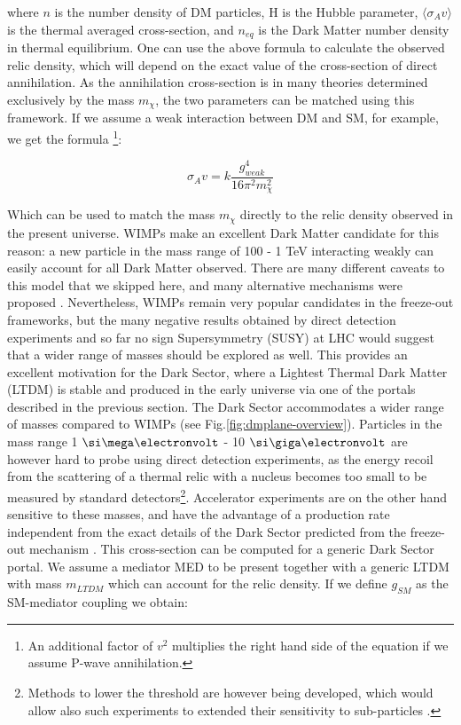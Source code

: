   where $n$ is the number density of DM particles, H is the Hubble parameter,  $\langle \sigma_A v \rangle$ is the thermal averaged cross-section, and $n_{eq}$ is the Dark Matter number density in thermal equilibrium. One can use the above formula to calculate the observed relic density, which will depend on the exact value of the cross-section of direct annihilation. As the annihilation cross-section is in many theories determined exclusively by the mass $m_{\chi}$, the two parameters can be matched using this framework. If we assume a weak interaction between DM and SM, for example, we get the formula \cite{Feng:2010gw}\footnote{An additional factor of $v^2$ multiplies the right hand side of the equation if we assume P-wave annihilation.}:

  \begin{equation}
    \label{eq:dm-fo-sigma}
    \sigma_A v = k \frac{g^4_{weak}}{16 \pi^2 m^2_{\chi}}
  \end{equation}

  Which can be used to match the mass $m_{\chi}$ directly to the relic density observed in the present universe. WIMPs make an excellent Dark Matter candidate for this reason: a new particle in the mass range of 100 \gev - 1 \si{\tera\electronvolt} interacting weakly can easily account for all Dark Matter observed. There are many different caveats to this model that we skipped here, and many alternative mechanisms were proposed \cite{Hall:2009bx,Feng:2010gw,Marsh:2015xka,Griest:1990kh,Arcadi:2017kky}. Nevertheless, WIMPs remain very popular candidates in the freeze-out frameworks, but the many negative results obtained by direct detection experiments and so far no sign Supersymmetry (SUSY) at LHC would suggest that a wider range of masses should be explored as well. This provides an excellent motivation for the Dark Sector, where a Lightest Thermal Dark Matter (LTDM) is stable and produced in the early universe via one of the portals described in the previous section. The Dark Sector accommodates a wider range of masses compared to WIMPs (see Fig.\ref{fig:dmplane-overview}). Particles in the mass range 1 $\mev$ - 10 $\gev$ are however hard to probe using direct detection experiments, as the energy recoil from the scattering of a thermal relic with a nucleus becomes too small to be measured by standard detectors\footnote{Methods to lower the threshold are however being developed, which would allow also such experiments to extended their sensitivity to sub-\gev particles \cite{Baracchini:2020nut}.}. Accelerator experiments are on the other hand sensitive to these masses, and have the advantage of a production rate independent from the exact details of the Dark Sector predicted from the freeze-out mechanism \cite{battaglieri2017cosmic}. This cross-section can be computed for a generic Dark Sector portal. We assume a mediator MED to be present together with a generic LTDM with mass $m_{LTDM}$ which can account for the relic density. If we define $g_{SM}$ as the SM-mediator coupling we obtain:

